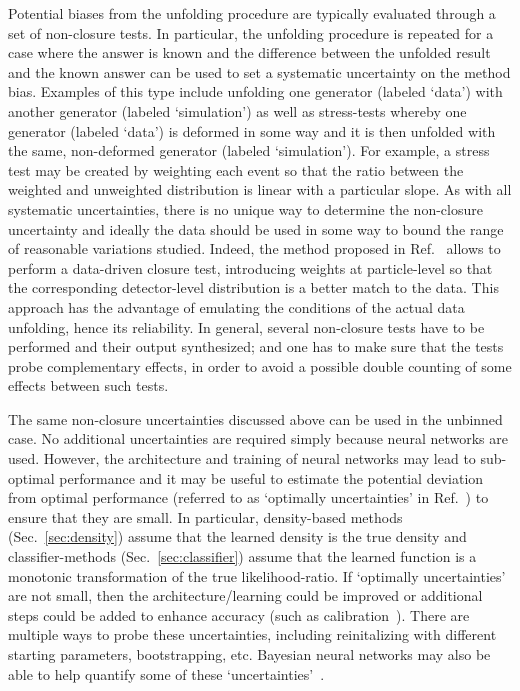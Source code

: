 \documentclass[a4paper,11pt]{article}
\begin{document}
Potential biases from the unfolding procedure are typically evaluated through a set of non-closure tests.  In particular, the unfolding procedure is repeated for a case where the answer is known and the difference between the unfolded result and the known answer can be used to set a systematic uncertainty on the method bias.  Examples of this type include unfolding one generator (labeled `data') with another generator (labeled `simulation') as well as stress-tests whereby one generator (labeled `data') is deformed in some way and it is then unfolded with the same, non-deformed generator (labeled `simulation').  
For example, a stress test may be created by weighting each event so that the ratio between the weighted and unweighted distribution is linear with a particular slope.  
As with all systematic uncertainties, there is no unique way to determine the non-closure uncertainty and ideally the data should be used in some way to bound the range of reasonable variations studied.
Indeed, the method proposed in Ref.~\cite{Malaescu:2009dm} allows to perform a data-driven closure test, introducing weights at particle-level so that the corresponding detector-level distribution is a better match to the data. This approach has the advantage of emulating the conditions of the actual data unfolding, hence its reliability.
In general, several non-closure tests have to be performed and their output synthesized; and one has to make sure that the tests probe complementary effects, in order to avoid a possible double counting of some effects between such tests.

The same non-closure uncertainties discussed above can be used in the unbinned case.  No additional uncertainties are required simply because neural networks are used.  However, the architecture and training of neural networks may lead to sub-optimal performance and it may be useful to estimate the potential deviation from optimal performance (referred to as `optimally uncertainties' in Ref.~\cite{Nachman:2019dol}) to ensure that they are small.  In particular, density-based methods (Sec.~\ref{sec:density}) assume that the learned density is the true density and classifier-methods (Sec.~\ref{sec:classifier}) assume that the learned function is a monotonic transformation of the true likelihood-ratio.  If `optimally uncertainties' are not small, then the architecture/learning could be improved or additional steps could be added to enhance accuracy (such as calibration~\cite{Cranmer:2015bka}).  There are multiple ways to probe these uncertainties, including reinitalizing with different starting parameters, bootstrapping, etc.  Bayesian neural networks may also be able to help quantify some of these `uncertainties'~\cite{Bellagente:2021yyh}.
\end{document}

